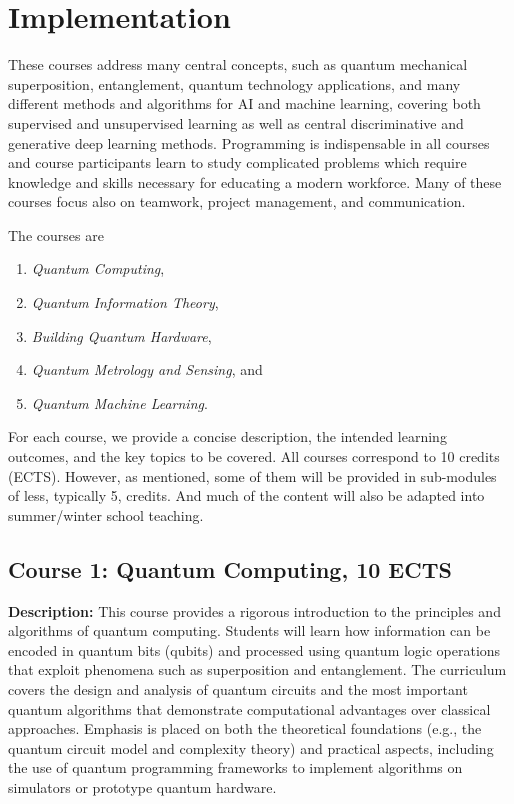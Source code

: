 \documentclass{scrreprt}
\begin{document}
\section{Implementation}

These courses address many central concepts, such as quantum
mechanical superposition, entanglement, quantum technology applications, and many
different methods and algorithms for AI and machine learning, covering
both supervised and unsupervised learning as well as central
discriminative and generative deep learning methods. Programming is
indispensable in all courses and course participants learn to
study complicated problems which require knowledge and skills
necessary for educating a modern workforce. Many of these courses
focus also on teamwork, project management, and communication.

The courses are
\begin{enumerate}
\item \textit{Quantum Computing},
\item \textit{Quantum Information Theory},
\item \textit{Building Quantum Hardware},
\item \textit{Quantum Metrology and Sensing}, and
\item \textit{Quantum Machine Learning}.
\end{enumerate}

For each course, we provide a concise description, the intended learning outcomes, and the key topics to be covered.
All courses correspond to 10 credits (ECTS). However, as mentioned, some of them will be provided in sub-modules of less, typically 5, credits. And much of the content will also be adapted into summer/winter school teaching.

\subsection{Course 1: Quantum Computing, 10 ECTS}

\textbf{Description:} This course provides a rigorous introduction to the principles and algorithms of quantum computing. Students will learn how information can be encoded in quantum bits (qubits) and processed using quantum logic operations that exploit phenomena such as superposition and entanglement. The curriculum covers the design and analysis of quantum circuits and the most important quantum algorithms that demonstrate computational advantages over classical approaches. Emphasis is placed on both the theoretical foundations (e.g., the quantum circuit model and complexity theory) and practical aspects, including the use of quantum programming frameworks to implement algorithms on simulators or prototype quantum hardware.
\end{document}
